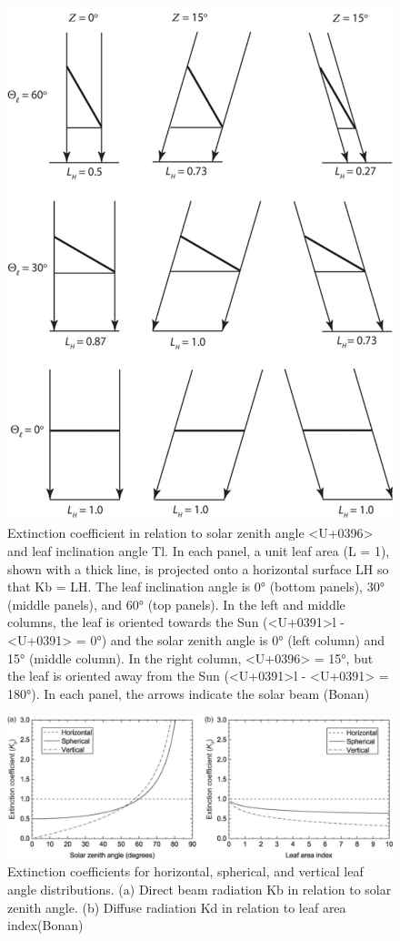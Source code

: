 \documentclass[
  oneside]{book}
\begin{document}
\begin{figure}

{\centering \includegraphics[width=0.8\linewidth]{figures/chap3/f311_LLh} 

}

\caption{Extinction coefficient in relation to solar zenith angle <U+0396> and leaf inclination angle Tl. In each panel, a unit leaf area (L = 1), shown with a thick line, is projected onto a horizontal surface LH so that Kb = LH. The leaf inclination angle is 0° (bottom panels), 30° (middle panels), and 60° (top panels). In the left and middle columns, the leaf is oriented towards the Sun (<U+0391>l - <U+0391> = 0°) and the solar zenith angle is 0° (left column) and 15° (middle column). In the right column, <U+0396> = 15°, but the leaf is oriented away from the Sun (<U+0391>l - <U+0391> = 180°). In each panel, the arrows indicate the solar beam (Bonan)}\label{fig:f311}
\end{figure}

\begin{figure}

{\centering \includegraphics[width=0.8\linewidth]{figures/chap3/f312_Kb_angle} 

}

\caption{Extinction coefficients for horizontal, spherical, and vertical leaf angle distributions. (a) Direct beam radiation Kb in relation to solar zenith angle. (b) Diffuse radiation Kd in relation to leaf area index(Bonan)}\label{fig:f312}
\end{figure}
\end{document}

